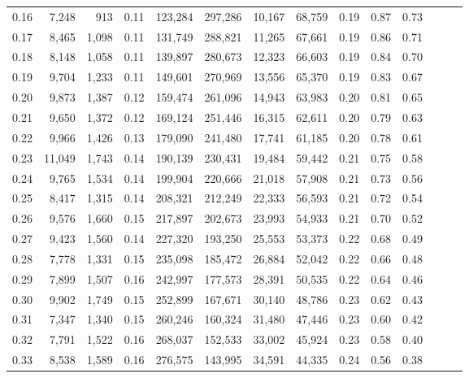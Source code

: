 \begin{tabular}{rrrrrrrrrrrrrr}
0.16 &   7,248 &    913 &  0.11 &  123,284 &  297,286 &  10,167 &  68,759 &  0.19 &  0.87 &      0.73 \\
0.17 &   8,465 &  1,098 &  0.11 &  131,749 &  288,821 &  11,265 &  67,661 &  0.19 &  0.86 &      0.71 \\
0.18 &   8,148 &  1,058 &  0.11 &  139,897 &  280,673 &  12,323 &  66,603 &  0.19 &  0.84 &      0.70 \\
0.19 &   9,704 &  1,233 &  0.11 &  149,601 &  270,969 &  13,556 &  65,370 &  0.19 &  0.83 &      0.67 \\
0.20 &   9,873 &  1,387 &  0.12 &  159,474 &  261,096 &  14,943 &  63,983 &  0.20 &  0.81 &      0.65 \\
0.21 &   9,650 &  1,372 &  0.12 &  169,124 &  251,446 &  16,315 &  62,611 &  0.20 &  0.79 &      0.63 \\
0.22 &   9,966 &  1,426 &  0.13 &  179,090 &  241,480 &  17,741 &  61,185 &  0.20 &  0.78 &      0.61 \\
0.23 &  11,049 &  1,743 &  0.14 &  190,139 &  230,431 &  19,484 &  59,442 &  0.21 &  0.75 &      0.58 \\
0.24 &   9,765 &  1,534 &  0.14 &  199,904 &  220,666 &  21,018 &  57,908 &  0.21 &  0.73 &      0.56 \\
0.25 &   8,417 &  1,315 &  0.14 &  208,321 &  212,249 &  22,333 &  56,593 &  0.21 &  0.72 &      0.54 \\
0.26 &   9,576 &  1,660 &  0.15 &  217,897 &  202,673 &  23,993 &  54,933 &  0.21 &  0.70 &      0.52 \\
0.27 &   9,423 &  1,560 &  0.14 &  227,320 &  193,250 &  25,553 &  53,373 &  0.22 &  0.68 &      0.49 \\
0.28 &   7,778 &  1,331 &  0.15 &  235,098 &  185,472 &  26,884 &  52,042 &  0.22 &  0.66 &      0.48 \\
0.29 &   7,899 &  1,507 &  0.16 &  242,997 &  177,573 &  28,391 &  50,535 &  0.22 &  0.64 &      0.46 \\
0.30 &   9,902 &  1,749 &  0.15 &  252,899 &  167,671 &  30,140 &  48,786 &  0.23 &  0.62 &      0.43 \\
0.31 &   7,347 &  1,340 &  0.15 &  260,246 &  160,324 &  31,480 &  47,446 &  0.23 &  0.60 &      0.42 \\
0.32 &   7,791 &  1,522 &  0.16 &  268,037 &  152,533 &  33,002 &  45,924 &  0.23 &  0.58 &      0.40 \\
0.33 &   8,538 &  1,589 &  0.16 &  276,575 &  143,995 &  34,591 &  44,335 &  0.24 &  0.56 &      0.38 \\

\end{tabular}
